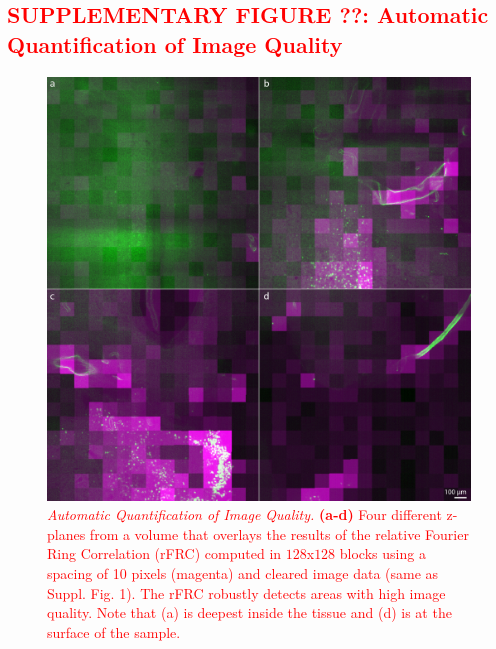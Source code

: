 \documentclass[]{spie}  %
\def\red{\textcolor{red}}
\begin{document}
\subsection*{\red{SUPPLEMENTARY FIGURE ??: Automatic Quantification of Image Quality}}
\vspace{1mm}
\begin{figure}[h!]
\includegraphics[width=\textwidth]{rFRC.jpg}
\vspace{-2.0mm}
\caption{\hspace{-0.5mm} \red{\emph{Automatic Quantification of Image Quality.} \textbf{(a-d)} Four different z-planes from a volume that overlays the results of the relative Fourier Ring Correlation (rFRC) computed in $128$x$128$ blocks using a spacing of 10 pixels (magenta) and cleared image data (same as Suppl. Fig. 1). The rFRC robustly detects areas with high image quality. Note that (a) is deepest inside the tissue and (d) is at the surface of the sample.
}}
\label{fig:sup-rFRC}
\end{figure}

\pagebreak
\end{document}
